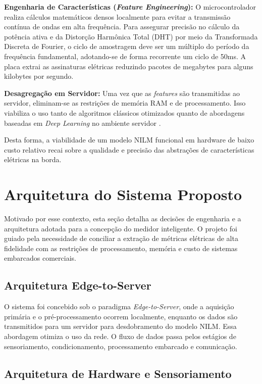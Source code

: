 \documentclass[12pt]{article}
\begin{document}
\textbf{Engenharia de Caracter\'isticas (\textit{Feature Engineering}):} O
microcontrolador realiza c\'alculos matem\'aticos densos localmente para evitar a
transmiss\~ao cont\'inua de ondas em alta frequ\^encia. Para assegurar precis\~ao
no c\'alculo da pot\^encia ativa e da Distor\c{c}\~ao Harm\^onica Total (DHT) por
meio da Transformada Discreta de Fourier, o ciclo de amostragem deve ser um
m\'ultiplo do per\'iodo da frequ\^encia fundamental, adotando-se de forma
recorrente um ciclo de 50ms. A placa extrai as assinaturas el\'etricas reduzindo
pacotes de megabytes para alguns kilobytes por segundo.

\textbf{Desagrega\c{c}\~ao em Servidor:} Uma vez que as \textit{features} s\~ao
transmitidas ao servidor, eliminam-se as restri\c{c}\~oes de mem\'oria RAM e de
processamento. Isso viabiliza o uso tanto de algoritmos cl\'assicos otimizados
\cite{ref6} quanto de abordagens baseadas em \textit{Deep Learning} no ambiente
servidor \cite{ref7}.

Desta forma, a viabilidade de um modelo NILM funcional em hardware de baixo custo
relativo recai sobre a qualidade e precis\~ao das abstra\c{c}\~oes de
caracter\'isticas el\'etricas na borda.


\section{Arquitetura do Sistema Proposto}

Motivado por esse contexto, esta se\c{c}\~ao detalha as decis\~oes de engenharia e
a arquitetura adotada para a concep\c{c}\~ao do medidor inteligente. O projeto foi
guiado pela necessidade de conciliar a extra\c{c}\~ao de m\'etricas el\'etricas de
alta fidelidade com as restri\c{c}\~oes de processamento, mem\'oria e custo de
sistemas embarcados comerciais.

\subsection{Arquitetura Edge-to-Server}

O sistema foi concebido sob o paradigma \textit{Edge-to-Server}, onde a aquisi\c{c}\~ao
prim\'aria e o pr\'e-processamento ocorrem localmente, enquanto os dados s\~ao
transmitidos para um servidor para desdobramento do modelo NILM. Essa abordagem
otimiza o uso da rede. O fluxo de dados passa pelos est\'agios de sensoriamento,
condicionamento, processamento embarcado e comunica\c{c}\~ao.

\subsection{Arquitetura de Hardware e Sensoriamento}
\end{document}
